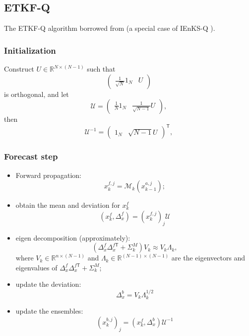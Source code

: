 \documentclass{article}
\newcommand{\trans}{\mathsf{T}}
\begin{document}
\subsection{ETKF-Q}
The ETKF-Q algorithm borrowed from \cite{Peyron2021LAwithAE} (a special case of IEnKS-Q \cite{Fillion2020IEnKS}).

\subsubsection{Initialization}

Construct $U\in\mathbb{R}^{N\times(N-1)}$ such that
$$
	\begin{pmatrix}
		\frac1{\sqrt N}1_N & U
	\end{pmatrix}
$$
is orthogonal, and let
$$
	\mathscr{U}=
	\begin{pmatrix}
		\frac1N1_N & \frac{1}{\sqrt{N-1}}U
	\end{pmatrix},
$$
then
$$
	\mathscr{U}^{-1}=
	\begin{pmatrix}
		1_N & \sqrt{N-1}U
	\end{pmatrix}^\trans ,
$$

\subsubsection{Forecast step}
\begin{itemize}
	\item Forward propagation:
	      $$
		      x_k^{f,j}=\mathcal{M}_k(x_{k-1}^{a,j});
	      $$
	\item obtain the mean and deviation for $x_k^f$
	      $$
		      (x_k^f,\Delta_x^f)=(x_k^{f,j})_j\mathscr{U}
	      $$
	\item eigen decomposition (approximately):
	      $$
		      (\Delta_x^f\Delta_x^{f\trans}+\Sigma_k^M)V_k\approx V_k\Lambda_k,
	      $$
	      where $V_k\in\mathbb{R}^{n\times(N-1)}$ and $\Lambda_k\in\mathbb{R}^{(N-1)\times(N-1)}$ are the eigenvectors and eigenvalues of $\Delta_x^f\Delta_x^{f\trans}+\Sigma_k^M$;
	\item update the deviation:
	      $$\Delta_x^b=V_k\Lambda_k^{1/2}$$
	\item update the ensembles:
	      $$(x_k^{b,j})_j=(x_k^f,\Delta_x^b)\mathscr{U}^{-1}$$
\end{itemize}
\end{document}
